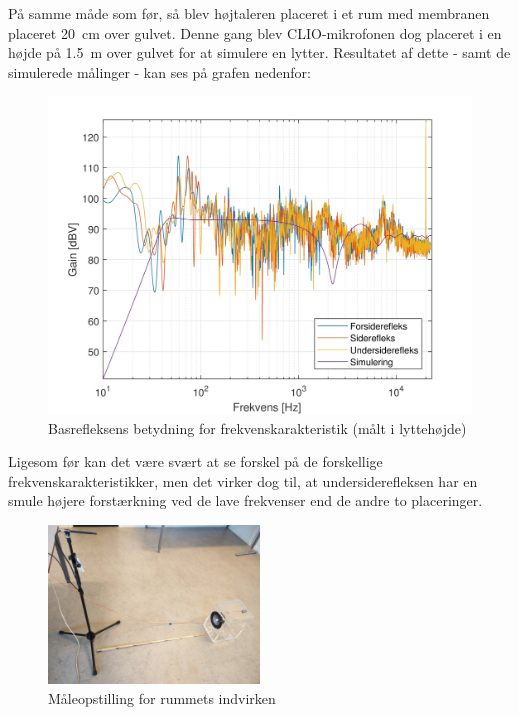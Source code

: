 \newpage
På samme måde som før, så blev højtaleren placeret i et rum med membranen placeret \SI{20}{\centi\meter} over gulvet. Denne gang blev CLIO-mikrofonen dog placeret i en højde på \SI{1,5}{\meter} over gulvet for at simulere en lytter. Resultatet af dette - samt de simulerede målinger - kan ses på grafen nedenfor:
\begin{figure}[H]
	\centering
	\vspace{-12pt}
	\includegraphics[width=\textwidth]{Billeder/Grafer/RealListen}
	\caption{Basrefleksens betydning for frekvenskarakteristik (målt i lyttehøjde)}
\end{figure}

Ligesom før kan det være svært at se forskel på de forskellige frekvenskarakteristikker, men det virker dog til, at undersiderefleksen har en smule højere forstærkning ved de lave frekvenser end de andre to placeringer.
\begin{figure}[H]
	\centering
	\includegraphics[width=0.5\textwidth]{Billeder/RealMaaling}
	\caption{Måleopstilling for rummets indvirken}
\end{figure}